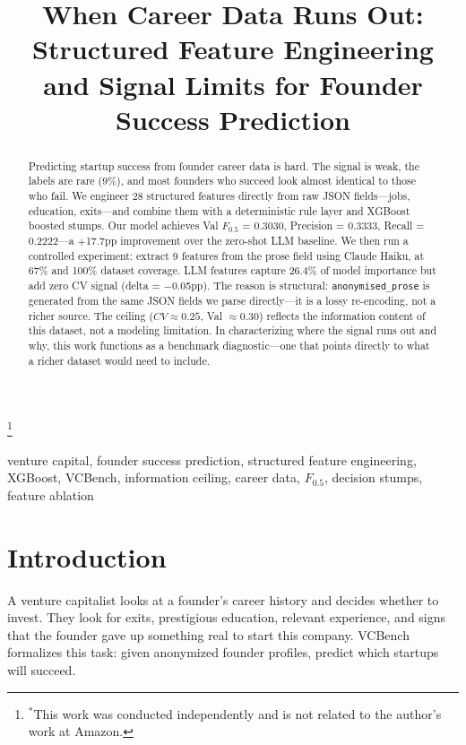 \documentclass[10pt, conference]{IEEEtran}
\newcommand\blfootnote[1]{
  \begingroup
  \renewcommand\thefootnote{}\footnote{#1}
  \addtocounter{footnote}{-1}
  \endgroup
}
\begin{document}
\title{When Career Data Runs Out: Structured Feature Engineering and Signal Limits for Founder Success Prediction}

\author{
}

\maketitle

\blfootnote{$^*$This work was conducted independently and is not related to the author's work at Amazon.}

\begin{abstract}
Predicting startup success from founder career data is hard. The signal is weak, the labels are rare (9\%), and most founders who succeed look almost identical to those who fail. We engineer 28 structured features directly from raw JSON fields---jobs, education, exits---and combine them with a deterministic rule layer and XGBoost boosted stumps. Our model achieves Val $F_{0.5}$ = 0.3030, Precision = 0.3333, Recall = 0.2222---a +17.7pp improvement over the zero-shot LLM baseline. We then run a controlled experiment: extract 9 features from the prose field using Claude Haiku, at 67\% and 100\% dataset coverage. LLM features capture 26.4\% of model importance but add zero CV signal (delta = $-$0.05pp). The reason is structural: \texttt{anonymised\_prose} is generated from the same JSON fields we parse directly---it is a lossy re-encoding, not a richer source. The ceiling ($CV \approx 0.25$, Val $\approx 0.30$) reflects the information content of this dataset, not a modeling limitation. In characterizing where the signal runs out and why, this work functions as a benchmark diagnostic---one that points directly to what a richer dataset would need to include.
\end{abstract}

\begin{IEEEkeywords}
venture capital, founder success prediction, structured feature engineering, XGBoost, VCBench, information ceiling, career data, $F_{0.5}$, decision stumps, feature ablation
\end{IEEEkeywords}

\section{Introduction}

A venture capitalist looks at a founder's career history and decides whether to invest. They look for exits, prestigious education, relevant experience, and signs that the founder gave up something real to start this company. VCBench \cite{vcbench} formalizes this task: given anonymized founder profiles, predict which startups will succeed.
\end{document}
